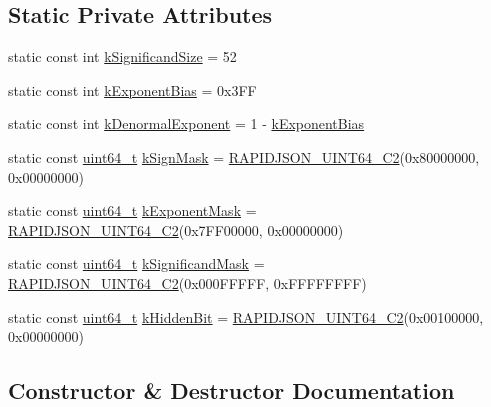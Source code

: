 \subsection*{Static Private Attributes}
\begin{DoxyCompactItemize}
\item 
static const int \hyperlink{classinternal_1_1Double_a2e41ff26c6ad85628305c479fbd451aa}{k\+Significand\+Size} = 52
\item 
static const int \hyperlink{classinternal_1_1Double_a7d4436067abd6620d1ed156b3e9d54e2}{k\+Exponent\+Bias} = 0x3\+FF
\item 
static const int \hyperlink{classinternal_1_1Double_a8e8f5769df7c1a7273d83d61233a682f}{k\+Denormal\+Exponent} = 1 -\/ \hyperlink{classinternal_1_1Double_a7d4436067abd6620d1ed156b3e9d54e2}{k\+Exponent\+Bias}
\item 
static const \hyperlink{stdint_8h_aec6fcb673ff035718c238c8c9d544c47}{uint64\+\_\+t} \hyperlink{classinternal_1_1Double_a43d4007b0121278555519de8d4fdc59e}{k\+Sign\+Mask} = \hyperlink{rapidjson_8h_aaee1245f375a71be1ac9b8a07ba5fb8f}{R\+A\+P\+I\+D\+J\+S\+O\+N\+\_\+\+U\+I\+N\+T64\+\_\+\+C2}(0x80000000, 0x00000000)
\item 
static const \hyperlink{stdint_8h_aec6fcb673ff035718c238c8c9d544c47}{uint64\+\_\+t} \hyperlink{classinternal_1_1Double_a39172dca75a2a5ddec868a170f7a7a3e}{k\+Exponent\+Mask} = \hyperlink{rapidjson_8h_aaee1245f375a71be1ac9b8a07ba5fb8f}{R\+A\+P\+I\+D\+J\+S\+O\+N\+\_\+\+U\+I\+N\+T64\+\_\+\+C2}(0x7\+F\+F00000, 0x00000000)
\item 
static const \hyperlink{stdint_8h_aec6fcb673ff035718c238c8c9d544c47}{uint64\+\_\+t} \hyperlink{classinternal_1_1Double_aa34deedf05f755101bf807419d113bf5}{k\+Significand\+Mask} = \hyperlink{rapidjson_8h_aaee1245f375a71be1ac9b8a07ba5fb8f}{R\+A\+P\+I\+D\+J\+S\+O\+N\+\_\+\+U\+I\+N\+T64\+\_\+\+C2}(0x000\+F\+F\+F\+F\+F, 0x\+F\+F\+F\+F\+F\+F\+F\+F)
\item 
static const \hyperlink{stdint_8h_aec6fcb673ff035718c238c8c9d544c47}{uint64\+\_\+t} \hyperlink{classinternal_1_1Double_a93fcf8c6a54766f9239f1d3cb0ca0710}{k\+Hidden\+Bit} = \hyperlink{rapidjson_8h_aaee1245f375a71be1ac9b8a07ba5fb8f}{R\+A\+P\+I\+D\+J\+S\+O\+N\+\_\+\+U\+I\+N\+T64\+\_\+\+C2}(0x00100000, 0x00000000)
\end{DoxyCompactItemize}


\subsection{Constructor \& Destructor Documentation}
\mbox{\label{classinternal_1_1Double_a98e2cff9880cd032d174e9721ae40ddd}} 
